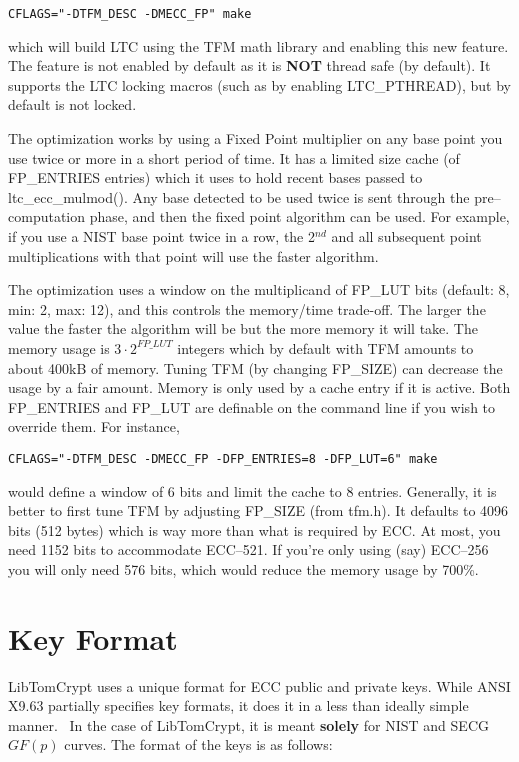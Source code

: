 \documentclass[synpaper]{book}
\newcommand{\mysection}[1]    %
	{                   %
	\section{#1}
   \markboth{\textsf{www.libtom.org}}{\thesection ~ {#1}}
	}
\begin{document}
\begin{verbatim}
CFLAGS="-DTFM_DESC -DMECC_FP" make
\end{verbatim}

which will build LTC using the TFM math library and enabling this new feature.  The feature is not enabled by default as it is \textbf{NOT} thread
safe (by default).  It supports the LTC locking macros (such as by enabling LTC\_PTHREAD), but by default is not locked.

The optimization works by using a Fixed Point multiplier on any base point you use twice or more in a short period of time.  It has a limited size
cache (of FP\_ENTRIES entries) which it uses to hold recent bases passed to ltc\_ecc\_mulmod().  Any base detected to be used twice is sent through the
pre--computation phase, and then the fixed point algorithm can be used.  For example, if you use a NIST base point twice in a row, the 2$^{nd}$ and
all subsequent point multiplications with that point will use the faster algorithm.

The optimization uses a window on the multiplicand of FP\_LUT bits (default: 8, min: 2, max: 12), and this controls the memory/time trade-off. The larger the
value the faster the algorithm will be but the more memory it will take.  The memory usage is $3 \cdot 2^{FP\_LUT}$ integers which by default
with TFM amounts to about 400kB of memory.  Tuning TFM (by changing FP\_SIZE) can decrease the usage by a fair amount.  Memory is only used by a cache entry
if it is active.  Both FP\_ENTRIES and FP\_LUT are definable on the command line if you wish to override them. For instance,

\begin{verbatim}
CFLAGS="-DTFM_DESC -DMECC_FP -DFP_ENTRIES=8 -DFP_LUT=6" make
\end{verbatim}

\begin{flushleft}
  
would define a window of 6 bits and limit the cache to 8 entries.  Generally, it is better to first tune TFM by adjusting FP\_SIZE (from tfm.h).  It defaults
to 4096 bits (512 bytes) which is way more than what is required by ECC.  At most, you need 1152 bits to accommodate ECC--521.  If you're only using (say)
ECC--256 you will only need 576 bits, which would reduce the memory usage by 700\%.
\end{flushleft}

\mysection{Key Format}
LibTomCrypt uses a unique format for ECC public and private keys.  While ANSI X9.63 partially specifies key formats, it does it in a less than ideally simple manner.  \
In the case of LibTomCrypt, it is meant \textbf{solely} for NIST and SECG $GF(p)$ curves.  The format of the keys is as follows:
\end{document}
